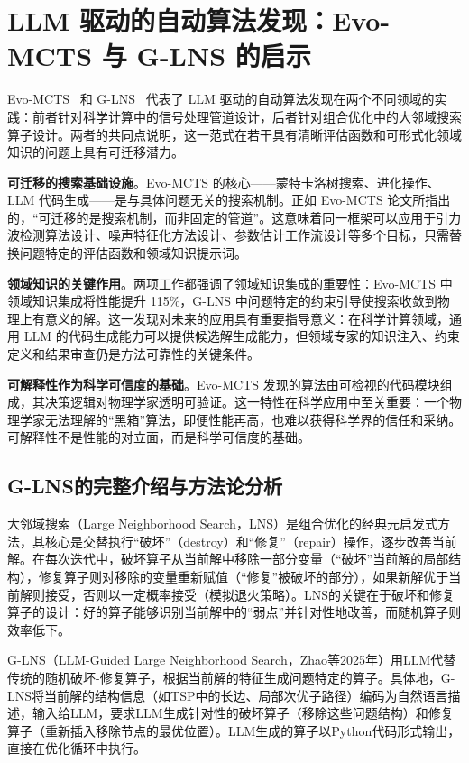 \section{LLM 驱动的自动算法发现：Evo-MCTS 与 G-LNS 的启示}

Evo-MCTS~\cite{wang2025evomcts} 和 G-LNS~\cite{zhao2025glns} 代表了 LLM 驱动的自动算法发现在两个不同领域的实践：前者针对科学计算中的信号处理管道设计，后者针对组合优化中的大邻域搜索算子设计。两者的共同点说明，这一范式在若干具有清晰评估函数和可形式化领域知识的问题上具有可迁移潜力。

\textbf{可迁移的搜索基础设施}。Evo-MCTS 的核心——蒙特卡洛树搜索、进化操作、LLM 代码生成——是与具体问题无关的搜索机制。正如 Evo-MCTS 论文所指出的，“可迁移的是搜索机制，而非固定的管道”。这意味着同一框架可以应用于引力波检测算法设计、噪声特征化方法设计、参数估计工作流设计等多个目标，只需替换问题特定的评估函数和领域知识提示词。

\textbf{领域知识的关键作用}。两项工作都强调了领域知识集成的重要性：Evo-MCTS 中领域知识集成将性能提升 115\%，G-LNS 中问题特定的约束引导使搜索收敛到物理上有意义的解。这一发现对未来的应用具有重要指导意义：在科学计算领域，通用 LLM 的代码生成能力可以提供候选解生成能力，但领域专家的知识注入、约束定义和结果审查仍是方法可靠性的关键条件。

\textbf{可解释性作为科学可信度的基础}。Evo-MCTS 发现的算法由可检视的代码模块组成，其决策逻辑对物理学家透明可验证。这一特性在科学应用中至关重要：一个物理学家无法理解的“黑箱”算法，即便性能再高，也难以获得科学界的信任和采纳。可解释性不是性能的对立面，而是科学可信度的基础。

\subsection{G-LNS的完整介绍与方法论分析}

大邻域搜索（Large Neighborhood Search，LNS）是组合优化的经典元启发式方法，其核心是交替执行“破坏”（destroy）和“修复”（repair）操作，逐步改善当前解。在每次迭代中，破坏算子从当前解中移除一部分变量（“破坏”当前解的局部结构），修复算子则对移除的变量重新赋值（“修复”被破坏的部分），如果新解优于当前解则接受，否则以一定概率接受（模拟退火策略）。LNS的关键在于破坏和修复算子的设计：好的算子能够识别当前解中的“弱点”并针对性地改善，而随机算子则效率低下。

G-LNS（LLM-Guided Large Neighborhood Search，Zhao等2025年）用LLM代替传统的随机破坏-修复算子，根据当前解的特征生成问题特定的算子。具体地，G-LNS将当前解的结构信息（如TSP中的长边、局部次优子路径）编码为自然语言描述，输入给LLM，要求LLM生成针对性的破坏算子（移除这些问题结构）和修复算子（重新插入移除节点的最优位置）。LLM生成的算子以Python代码形式输出，直接在优化循环中执行。

